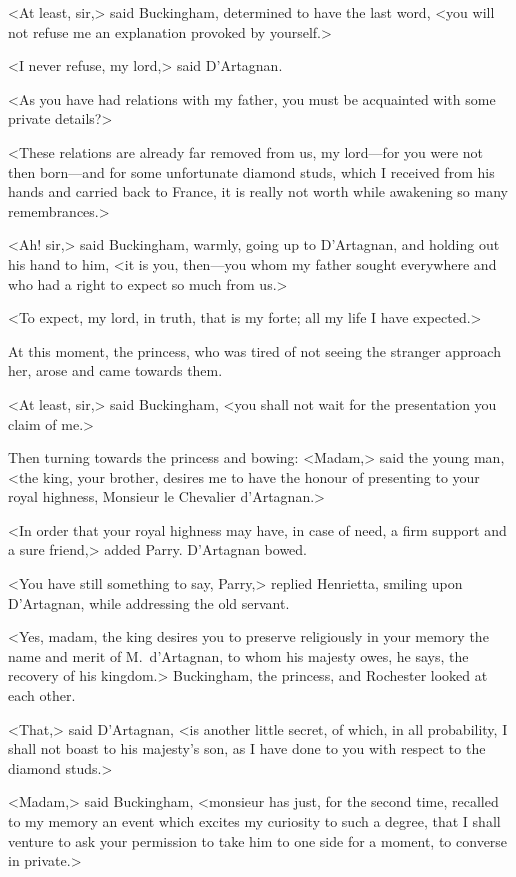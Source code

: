 <At least, sir,> said Buckingham, determined to have the last word, <you will not refuse me an explanation provoked by yourself.>

<I never refuse, my lord,> said D'Artagnan.

<As you have had relations with my father, you must be acquainted with some private details?>

<These relations are already far removed from us, my lord—for you were not then born—and for some unfortunate diamond studs, which I received from his hands and carried back to France, it is really not worth while awakening so many remembrances.>

<Ah! sir,> said Buckingham, warmly, going up to D'Artagnan, and holding out his hand to him, <it is you, then—you whom my father sought everywhere and who had a right to expect so much from us.>

<To expect, my lord, in truth, that is my forte; all my life I have expected.>

At this moment, the princess, who was tired of not seeing the stranger approach her, arose and came towards them.

<At least, sir,> said Buckingham, <you shall not wait for the presentation you claim of me.>

Then turning towards the princess and bowing: <Madam,> said the young man, <the king, your brother, desires me to have the honour of presenting to your royal highness, Monsieur le Chevalier d'Artagnan.>

<In order that your royal highness may have, in case of need, a firm support and a sure friend,> added Parry. D'Artagnan bowed.

<You have still something to say, Parry,> replied Henrietta, smiling upon D'Artagnan, while addressing the old servant.

<Yes, madam, the king desires you to preserve religiously in your memory the name and merit of M.~d'Artagnan, to whom his majesty owes, he says, the recovery of his kingdom.> Buckingham, the princess, and Rochester looked at each other.

<That,> said D'Artagnan, <is another little secret, of which, in all probability, I shall not boast to his majesty's son, as I have done to you with respect to the diamond studs.>

<Madam,> said Buckingham, <monsieur has just, for the second time, recalled to my memory an event which excites my curiosity to such a degree, that I shall venture to ask your permission to take him to one side for a moment, to converse in private.>

